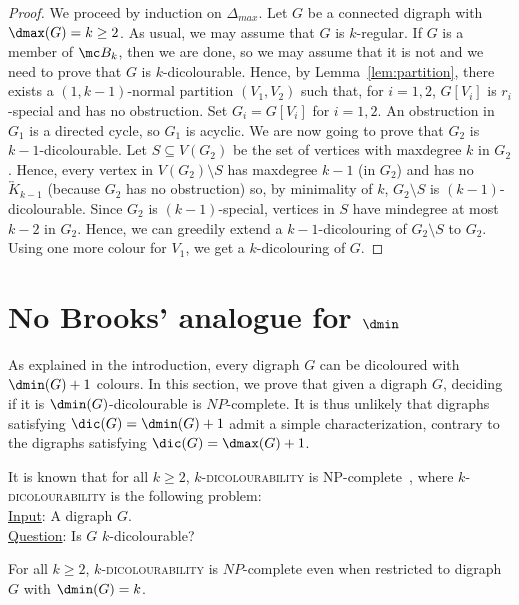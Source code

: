 \begin{proof}
We proceed by induction on $\Delta_{max}$. 
Let $G$ be a connected digraph with $\dmax(G) = k \geq 2$. As usual, we may assume that $G$ is $k$-regular. 
If $G$ is a member of $\mc B_k$, then we are done, so we may assume that it is not and we need to prove that $G$ is $k$-dicolourable. 
Hence, by Lemma~\ref{lem:partition}, there exists a $(1, k-1)$-normal partition $(V_1, V_2)$ such that, for $i=1, 2$,  $G[V_i]$ is $r_i$-special and has no obstruction. 
Set $G_i = G[V_i]$ for $i=1, 2$. An obstruction in $G_1$ is a directed cycle, so $G_1$ is acyclic. 
We are now going to prove that $G_2$ is $k-1$-dicolourable. 
Let $S \subseteq V(G_2)$ be the set of vertices with maxdegree $k$ in $G_2$. 
Hence, every vertex in $V(G_2) \setminus S$ has maxdegree $k-1$ (in $G_2$) and has no $\overleftrightarrow K_{k-1}$ (because $G_2$ has no obstruction) so, by minimality of $k$, $G_2 \setminus S$ is $(k-1)$-dicolourable. 
Since $G_2$ is $(k-1)$-special, vertices in $S$ have mindegree at most $k-2$ in $G_2$. Hence, we can greedily extend a $k-1$-dicolouring of $G_2 \setminus S$ to $G_2$. Using one more colour for $V_1$, we get a $k$-dicolouring of $G$. 
\end{proof}


\section{No Brooks' analogue for $\dmin$} \label{sec:dmin}

As explained in the introduction, every digraph $G$ can be dicoloured with $\dmin(G) + 1$ colours. 
In this section, we prove that given a digraph $G$, deciding if it is $\dmin(G)$-dicolourable is $NP$-complete. 
It is thus unlikely that digraphs satisfying $\dic(G) = \dmin(G)+1$ admit a simple characterization, contrary to the digraphs satisfying $\dic(G) = \dmax(G) +1$.  

It is known that for all $k \geq 2$, $k$-\textsc{dicolourability} is NP-complete~\cite{Bo04}, where $k$-\textsc{dicolourability} is the following problem:\\
\underline{Input}: A digraph $G$.\\
\underline{Question}: Is $G$ $k$-dicolourable?

\begin{theorem}
For all $k \geq 2$, $k$-\textsc{dicolourability} is $NP$-complete even when restricted to digraph $G$ with $\dmin(G) = k$. 
\end{theorem}


